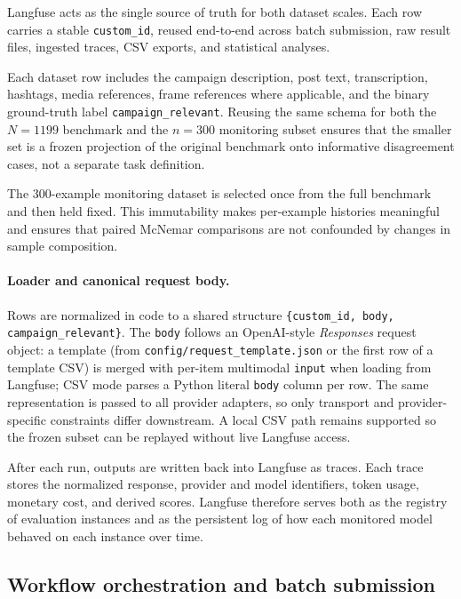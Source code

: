 Langfuse acts as the single source of truth for both dataset scales. Each row carries a stable \texttt{custom\_id}, reused end-to-end across batch submission, raw result files, ingested traces, CSV exports, and statistical analyses.

Each dataset row includes the campaign description, post text, transcription, hashtags, media references, frame references where applicable, and the binary ground-truth label \texttt{campaign\_relevant}. Reusing the same schema for both the \(N=1199\) benchmark and the \(n=300\) monitoring subset ensures that the smaller set is a frozen projection of the original benchmark onto informative disagreement cases, not a separate task definition.

The 300-example monitoring dataset is selected once from the full benchmark and then held fixed. This immutability makes per-example histories meaningful and ensures that paired McNemar comparisons are not confounded by changes in sample composition.

\paragraph{Loader and canonical request body.}
Rows are normalized in code to a shared structure \texttt{\{custom\_id, body, campaign\_relevant\}}. The \texttt{body} follows an OpenAI-style \emph{Responses} request object: a template (from \texttt{config/request\_template.json} or the first row of a template CSV) is merged with per-item multimodal \texttt{input} when loading from Langfuse; CSV mode parses a Python literal \texttt{body} column per row. The same representation is passed to all provider adapters, so only transport and provider-specific constraints differ downstream. A local CSV path remains supported so the frozen subset can be replayed without live Langfuse access.

After each run, outputs are written back into Langfuse as traces. Each trace stores the normalized response, provider and model identifiers, token usage, monetary cost, and derived scores. Langfuse therefore serves both as the registry of evaluation instances and as the persistent log of how each monitored model behaved on each instance over time.

\subsection{Workflow orchestration and batch submission}
\label{sec:batch-process}


